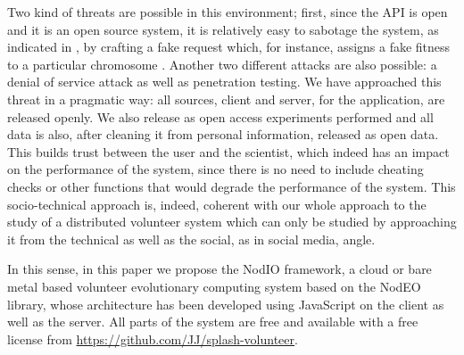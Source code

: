 \documentclass[journal,onecolumn]{IEEEtran}
\begin{document}
Two kind of threats are possible in this environment; first, since the
API is open and it is an open source system, it is relatively easy to
sabotage the system, as indicated in \cite{domingues2007sabotage}, by
crafting a fake request which, for instance, assigns a fake fitness to
a particular chromosome
. Another two different attacks are also
possible: a denial of service attack as well as penetration
testing. We have approached this threat in a pragmatic way: all
sources, client and server, for the application, are released
openly. %
 We also release as open access experiments performed
\cite{DBLP:journals/corr/GuervosG15} and all data is also, after
cleaning it from personal information, released %
 as open data. This
builds trust between the user and the scientist, which indeed has an
impact on the performance of the system, since there is no need to
include cheating checks or other functions that would degrade the
performance of the system. This socio-technical approach is, indeed,
coherent with our whole approach to the study of a distributed volunteer
 system which can only be studied by approaching it from the
technical as well as the social, as in social media, angle. 

In this sense, in this paper we propose the {\sf NodIO} framework, a
cloud or bare metal based volunteer evolutionary computing system
based on %
 the {\sf NodEO} library, whose architecture has been
developed using JavaScript on the client as well as the server.
All parts of the system are free and available with a free license
from \url{https://github.com/JJ/splash-volunteer}.

\end{document}
